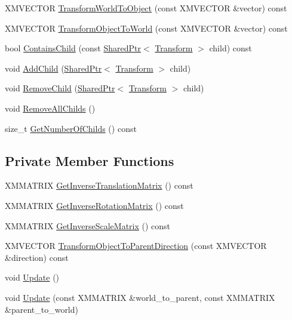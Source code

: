 \begin{DoxyCompactItemize}
\item 
X\+M\+V\+E\+C\+T\+OR \hyperlink{structmage_1_1_transform_a9c4fc1d0667d7a0a816f874d99bc82cf}{Transform\+World\+To\+Object} (const X\+M\+V\+E\+C\+T\+OR \&vector) const
\item 
X\+M\+V\+E\+C\+T\+OR \hyperlink{structmage_1_1_transform_a3e5b476d0078f6bf243a7effa0f781fc}{Transform\+Object\+To\+World} (const X\+M\+V\+E\+C\+T\+OR \&vector) const
\item 
bool \hyperlink{structmage_1_1_transform_a5a37f49cfb1f631ee580f368f8f84d87}{Contains\+Child} (const \hyperlink{namespacemage_a1e01ae66713838a7a67d30e44c67703e}{Shared\+Ptr}$<$ \hyperlink{structmage_1_1_transform}{Transform} $>$ child) const
\item 
void \hyperlink{structmage_1_1_transform_ac9fb285f730207740114b61bdb010bf9}{Add\+Child} (\hyperlink{namespacemage_a1e01ae66713838a7a67d30e44c67703e}{Shared\+Ptr}$<$ \hyperlink{structmage_1_1_transform}{Transform} $>$ child)
\item 
void \hyperlink{structmage_1_1_transform_a387bb274fec0cc5ea8d6f3504536ad50}{Remove\+Child} (\hyperlink{namespacemage_a1e01ae66713838a7a67d30e44c67703e}{Shared\+Ptr}$<$ \hyperlink{structmage_1_1_transform}{Transform} $>$ child)
\item 
void \hyperlink{structmage_1_1_transform_a1f9e00affb4b41338a6a946867a1d5a4}{Remove\+All\+Childs} ()
\item 
size\+\_\+t \hyperlink{structmage_1_1_transform_a4661691249d08ea41f9ee44f9838f0ed}{Get\+Number\+Of\+Childs} () const
\end{DoxyCompactItemize}
\subsection*{Private Member Functions}
\begin{DoxyCompactItemize}
\item 
X\+M\+M\+A\+T\+R\+IX \hyperlink{structmage_1_1_transform_a4cd7f7143c49772a83adfbd1d75dd475}{Get\+Inverse\+Translation\+Matrix} () const
\item 
X\+M\+M\+A\+T\+R\+IX \hyperlink{structmage_1_1_transform_a12e7ee212a9270fb3f01de9b7f5ee3b8}{Get\+Inverse\+Rotation\+Matrix} () const
\item 
X\+M\+M\+A\+T\+R\+IX \hyperlink{structmage_1_1_transform_a31da6a53e73a6254bc36cd0348c65cda}{Get\+Inverse\+Scale\+Matrix} () const
\item 
X\+M\+V\+E\+C\+T\+OR \hyperlink{structmage_1_1_transform_acc7a0f4ce2d6585fb19c1a6272cc84d2}{Transform\+Object\+To\+Parent\+Direction} (const X\+M\+V\+E\+C\+T\+OR \&direction) const
\item 
void \hyperlink{structmage_1_1_transform_ab80fc4a9bd034540b1d30242c4d9ca90}{Update} ()
\item 
void \hyperlink{structmage_1_1_transform_af0d19db352e703007c26f42a253ab2aa}{Update} (const X\+M\+M\+A\+T\+R\+IX \&world\+\_\+to\+\_\+parent, const X\+M\+M\+A\+T\+R\+IX \&parent\+\_\+to\+\_\+world)
\end{DoxyCompactItemize}

